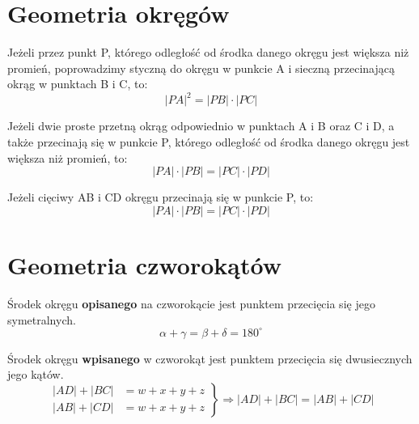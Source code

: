     \section{Geometria okręgów}
      \begin{theorem}
        Jeżeli przez punkt P, którego odległość od środka danego okręgu jest większa niż promień, poprowadzimy styczną do okręgu w punkcie A i sieczną przecinającą okrąg w punktach B i C, to:
        \begin{equation}
          |PA|^2 = |PB| \cdot |PC|
        \end{equation}
      \end{theorem}
      \begin{theorem}
        Jeżeli dwie proste przetną okrąg odpowiednio w punktach A i B oraz C i D, a także przecinają się w punkcie P, którego odległość od środka danego okręgu jest większa niż promień, to:
        \begin{equation}
          |PA| \cdot |PB| = |PC| \cdot |PD|
        \end{equation}
      \end{theorem}
      \begin{theorem}
        Jeżeli cięciwy AB i CD okręgu przecinają się w punkcie P, to:
        \begin{equation}
          |PA| \cdot |PB| = |PC| \cdot |PD|
        \end{equation}
      \end{theorem}
    \section{Geometria czworokątów}
      \begin{theorem}
        Środek okręgu \textbf{opisanego} na czworokącie jest punktem przecięcia się jego symetralnych.
        \begin{equation}
          \alpha + \gamma = \beta + \delta = 180^\circ
        \end{equation}
      \end{theorem}
      \begin{theorem}
        Środek okręgu \textbf{wpisanego} w czworokąt jest punktem przecięcia się dwusiecznych jego kątów.
        \begin{equation}
          \left.
            \begin{aligned}
              |AD| + |BC| &= w+x+y+z\\
              |AB| + |CD| &= w+x+y+z
            \end{aligned}
          \right\}
          \Rightarrow |AD| + |BC| = |AB| + |CD|
        \end{equation}
      \end{theorem}

